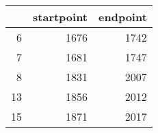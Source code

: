 % 
\begin{tabular}{rrr}
  \hline
 & startpoint & endpoint \\ 
  \hline
6 & 1676 & 1742 \\ 
  7 & 1681 & 1747 \\ 
  8 & 1831 & 2007 \\ 
  13 & 1856 & 2012 \\ 
  15 & 1871 & 2017 \\ 
   \hline
\end{tabular}
